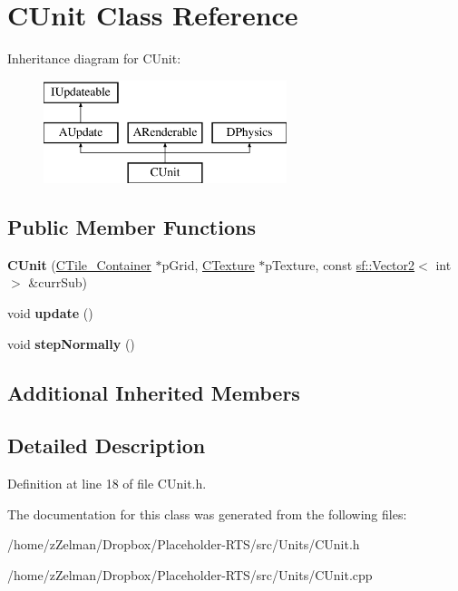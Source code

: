 \hypertarget{classCUnit}{\section{C\-Unit Class Reference}
\label{classCUnit}
}
Inheritance diagram for C\-Unit\-:\begin{figure}[H]
\begin{center}
\leavevmode
\includegraphics[height=3.000000cm]{classCUnit}
\end{center}
\end{figure}
\subsection*{Public Member Functions}
\begin{DoxyCompactItemize}
\item 
\hypertarget{classCUnit_ad438542eeeb73f398b526002e400cfc4}{{\bfseries C\-Unit} (\hyperlink{classCTile__Container}{C\-Tile\-\_\-\-Container} $\ast$p\-Grid, \hyperlink{classCTexture}{C\-Texture} $\ast$p\-Texture, const \hyperlink{classsf_1_1Vector2}{sf\-::\-Vector2}$<$ int $>$ \&curr\-Sub)}\label{classCUnit_ad438542eeeb73f398b526002e400cfc4}

\item 
\hypertarget{classCUnit_a8669992f78b1955874c14e66963f9752}{void {\bfseries update} ()}\label{classCUnit_a8669992f78b1955874c14e66963f9752}

\item 
\hypertarget{classCUnit_a3de88566a8ecfac18309859cf7282da2}{void {\bfseries step\-Normally} ()}\label{classCUnit_a3de88566a8ecfac18309859cf7282da2}

\end{DoxyCompactItemize}
\subsection*{Additional Inherited Members}


\subsection{Detailed Description}


Definition at line 18 of file C\-Unit.\-h.



The documentation for this class was generated from the following files\-:\begin{DoxyCompactItemize}
\item 
/home/z\-Zelman/\-Dropbox/\-Placeholder-\/\-R\-T\-S/src/\-Units/C\-Unit.\-h\item 
/home/z\-Zelman/\-Dropbox/\-Placeholder-\/\-R\-T\-S/src/\-Units/C\-Unit.\-cpp\end{DoxyCompactItemize}
